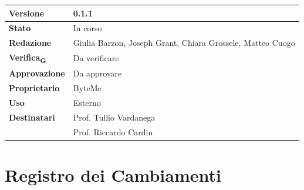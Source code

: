 \documentclass[11pt,a4paper]{article}
\newcommand{\gls}[1]{#1\textsubscript{G}}
\begin{document}
\begin{titlepage}
    \begin{table}[H]
        \centering
        \begin{tabular}{|l|p{5cm}|}
            \hline
            \textbf{Versione} & 0.1.1 \\
            \hline
            \textbf{Stato} & In corso \\
            \hline
            \textbf{Redazione} & Giulia Barzon, Joseph Grant, Chiara Grossele, Matteo Cuogo \\
            \hline
            \textbf{\gls{Verifica}} & Da verificare\\
            \hline
            \textbf{Approvazione} & Da approvare\\
            \hline
            \textbf{Proprietario} & ByteMe \\
            \hline
            \textbf{Uso} & Esterno \\
            \hline
            \textbf{Destinatari} & Prof. Tullio Vardanega \\ & Prof. Riccardo Cardin \\
            \hline
        \end{tabular}
    \end{table}
    
    \vfill
\end{titlepage}

\thispagestyle{empty}
\section*{Registro dei Cambiamenti}
\end{document}
